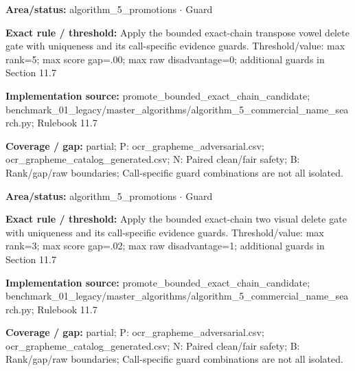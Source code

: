 \begin{tcolorbox}[enhanced,breakable,colback=white,colframe=Muted!45,boxrule=0.45pt,arc=1.5pt,left=6pt,right=6pt,top=5pt,bottom=5pt,title={\texttt{A5-CHAIN-TRANSPOSE-VOWEL-DELETE}},title after break={\texttt{A5-CHAIN-TRANSPOSE-VOWEL-DELETE}\ (continued)},fonttitle=\headingfont\bfseries\color{Navy},coltitle=Navy]
\textbf{Area/status:} algorithm\_\allowbreak{}5\_\allowbreak{}promotions $\boldsymbol{\cdot}$ Guard\par
\smallskip
\textbf{Exact rule / threshold:} Apply the bounded exact-chain transpose vowel delete gate with uniqueness and its call-specific evidence guards. Threshold/\allowbreak{}value: max rank=5; max score gap=.00; max raw disadvantage=0; additional guards in Section 11.7\par
\smallskip
\textbf{Implementation source:} promote\_\allowbreak{}bounded\_\allowbreak{}exact\_\allowbreak{}chain\_\allowbreak{}candidate; benchmark\_\allowbreak{}01\_\allowbreak{}legacy/\allowbreak{}master\_\allowbreak{}algorithms/\allowbreak{}algorithm\_\allowbreak{}5\_\allowbreak{}commercial\_\allowbreak{}name\_\allowbreak{}search.py; Rulebook 11.7\par
\smallskip
\textbf{Coverage / gap:} partial; P: ocr\_\allowbreak{}grapheme\_\allowbreak{}adversarial.csv; ocr\_\allowbreak{}grapheme\_\allowbreak{}catalog\_\allowbreak{}generated.csv; N: Paired clean/\allowbreak{}fair safety; B: Rank/\allowbreak{}gap/\allowbreak{}raw boundaries; Call-specific guard combinations are not all isolated.
\end{tcolorbox}
\begin{tcolorbox}[enhanced,breakable,colback=white,colframe=Muted!45,boxrule=0.45pt,arc=1.5pt,left=6pt,right=6pt,top=5pt,bottom=5pt,title={\texttt{A5-CHAIN-TWO-VISUAL-DELETE}},title after break={\texttt{A5-CHAIN-TWO-VISUAL-DELETE}\ (continued)},fonttitle=\headingfont\bfseries\color{Navy},coltitle=Navy]
\textbf{Area/status:} algorithm\_\allowbreak{}5\_\allowbreak{}promotions $\boldsymbol{\cdot}$ Guard\par
\smallskip
\textbf{Exact rule / threshold:} Apply the bounded exact-chain two visual delete gate with uniqueness and its call-specific evidence guards. Threshold/\allowbreak{}value: max rank=3; max score gap=.02; max raw disadvantage=1; additional guards in Section 11.7\par
\smallskip
\textbf{Implementation source:} promote\_\allowbreak{}bounded\_\allowbreak{}exact\_\allowbreak{}chain\_\allowbreak{}candidate; benchmark\_\allowbreak{}01\_\allowbreak{}legacy/\allowbreak{}master\_\allowbreak{}algorithms/\allowbreak{}algorithm\_\allowbreak{}5\_\allowbreak{}commercial\_\allowbreak{}name\_\allowbreak{}search.py; Rulebook 11.7\par
\smallskip
\textbf{Coverage / gap:} partial; P: ocr\_\allowbreak{}grapheme\_\allowbreak{}adversarial.csv; ocr\_\allowbreak{}grapheme\_\allowbreak{}catalog\_\allowbreak{}generated.csv; N: Paired clean/\allowbreak{}fair safety; B: Rank/\allowbreak{}gap/\allowbreak{}raw boundaries; Call-specific guard combinations are not all isolated.
\end{tcolorbox}
